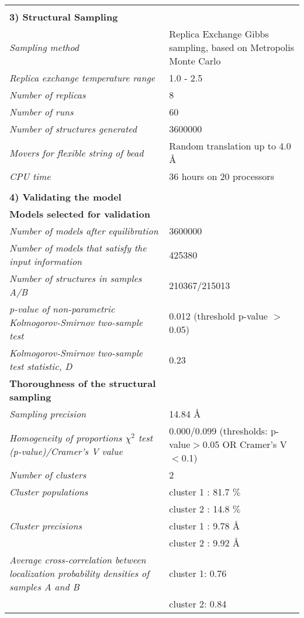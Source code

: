 \documentclass[8pt,a4paper]{article}
\begin{document}
\begin{longtable}{ p{} | p{} }
   &  \\
    \normalsize{\textbf{3) Structural Sampling}} & \\
    \hline
            \textit{Sampling method} & Replica Exchange Gibbs sampling, based on Metropolis Monte Carlo\\
                \textit{Replica exchange temperature range} & 1.0 - 2.5\\
                \textit{Number of replicas} & 8\\
                \textit{Number of runs} & 60\\
                \textit{Number of structures generated} & 3600000\\
                \textit{Movers for flexible string of bead} & Random translation up to 4.0 \AA\\
                \textit{CPU time} & 36 hours on 20 processors\\
        
   &  \\
  \normalsize{\textbf{4) Validating the model}} & \\
    \hline
   \textbf{Models selected for validation} & \\
    \hline
          \textit{Number of models after equilibration} & 3600000\\
                \textit{Number of models that satisfy the input information} & 425380\\
                \textit{Number of structures in samples A/B} & 210367/215013\\
                \textit{p-value of non-parametric Kolmogorov-Smirnov two-sample test} & 0.012 (threshold p-value $>$ 0.05)\\
                \textit{Kolmogorov-Smirnov two-sample test statistic, D} & 0.23\\
           \hline
    
    \textbf{Thoroughness of the structural sampling} & \\
    \hline
          \textit{Sampling precision} & 14.84 \AA \\
                \textit{Homogeneity of proportions $\chi^2$ test (p-value)/Cramer’s V value} & 0.000/0.099 (thresholds: p-value$>$0.05 OR Cramer's V$<$0.1)\\
                \textit{Number of clusters} & 2\\
                \textit{Cluster populations} & cluster 1 : 81.7 $\%$\\
            & cluster 2 : 14.8 $\%$ \\
                \textit{Cluster precisions} & cluster 1 : 9.78 \AA\\
            & cluster 2 : 9.92 \AA \\
                \textit{Average cross-correlation between localization probability densities of samples A and B} & cluster 1: 0.76\\
            & cluster 2: 0.84 \\
           \hline
  

\end{longtable}
\end{document}
